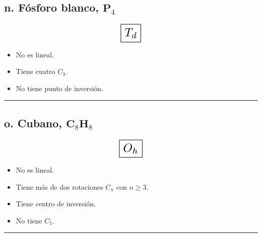 \iffalse
No es lineal.
No tiene rotaciones $C_n$ con $n \geq 3$.
Tiene $C_2$ perpendiculares al eje principal.
Tiene un plano de reflexión horizontal $\sigma_h$.

D_2h
\fi

\iffalse
\begin{center}
    \rule{15cm}{0.4pt}
\end{center}
\fi


\subsection*{n. Fósforo blanco, $\textbf{P}_4$}

\[ \scalebox{1.7}{$\boxed{T_d}$} \]

\begin{itemize}
    \item No es lineal.
    \item Tiene cuatro $C_3$.
    \item No tiene punto de inversión.
\end{itemize}

\iffalse
No es lineal.
Tiene cuatro $C_3$.
No tiene punto de inversión.

T_d
\fi

\begin{center}
    \rule{15cm}{0.4pt}
\end{center}


\subsection*{o. Cubano, $\textbf{C}_8\textbf{H}_8$}

\[ \scalebox{1.7}{$\boxed{O_h}$} \]

\begin{itemize}
    \item No es lineal.
    \item Tiene más de dos rotaciones $C_n$ con $n \geq 3$.
    \item Tiene centro de inversión.
    \item No tiene $C_5$.
\end{itemize}

\iffalse
No es lineal.
Tiene más de dos rotaciones $C_n$ con $n \geq 3$.
Tiene centro de inversión.
No tiene $C_5$.

O_h
\fi

\begin{center}
    \rule{15cm}{0.4pt}
\end{center}

